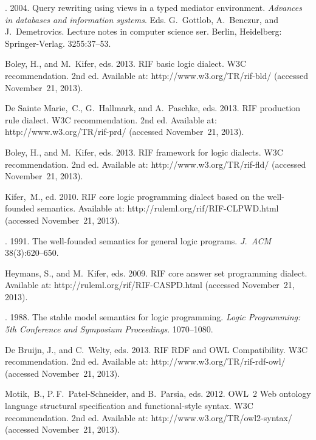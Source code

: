 \begin{multicols}{2}
{{\begin{thebibliography}{99}
. 2004. Query
rewriting using views in a typed mediator environment. \textit{Advances in databases and information
systems}. Eds. G.~Gottlob, A.~Benczur, and J.~Demetrovics. Lecture notes in
computer science ser. Berlin, Heidelberg: Springer-Verlag.
3255:37--53.


Boley, H., and M.~Kifer, eds. 2013. RIF basic logic dialect.  W3C recommendation.  2nd ed.
Available at: {\sf http://www.w3.org/TR/rif-bld/} (accessed November~21, 2013).

De Sainte Marie,~C., G.~Hallmark, and A.~Paschke, eds. 2013. RIF production rule dialect.
 W3C recommendation. 2nd ed. Available at: {\sf http://www.w3.org/TR/rif-prd/} (accessed
November~21, 2013).

Boley, H., and M.~Kifer, eds. 2013. RIF framework for logic dialects.  W3C
recommendation. 2nd ed. Available at: {\sf http://www.w3.org/TR/rif-fld/} (accessed
November~21, 2013).

Kifer,~M., ed. 2010. RIF core logic programming dialect based on the well-founded
semantics. Available at: {\sf http://ruleml.org/rif/RIF-CLPWD.html} (accessed
November~21, 2013).

. 1991. The well-founded semantics
for general logic programs. \textit{J.~ACM} 38(3):620--650.

Heymans, S., and M.~Kifer, eds. 2009. RIF core answer set programming dialect. Available
at: {\sf http://ruleml.org/rif/RIF-CASPD.html} (accessed November~21, 2013).


. 1988. The stable model semantics for logic
programming. \textit{Logic Programming: 5th Conference and Symposium Proceedings}.
1070--1080.

De Bruijn, J., and C.~Welty, eds. 2013. RIF RDF and OWL Compatibility.  W3C
recommendation. 2nd ed. Available at: {\sf http://www.w3.org/TR/rif-rdf-owl/} (accessed
November~21, 2013).

Motik,~B., P.\,F.~Patel-Schneider, and B.~Parsia, eds. 2012. OWL~2 Web ontology language structural specification
and functional-style syntax.  W3C recommendation. 2nd ed. Available at: {\sf
http://www.w3.org/TR/owl2-syntax/} (accessed November~21, 2013).




\end{thebibliography}}}
\end{multicols}
